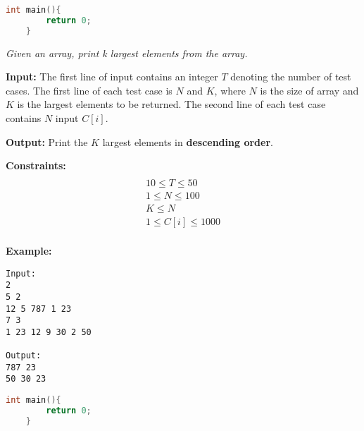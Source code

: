 \begin{solution}
\begin{lstlisting}[language=C++, caption="C++ Solution"]
	int main(){
		return 0;	
	}
\end{lstlisting}

\end{solution}



\begin{problem}
\textit{Given an array, print k largest elements from the array.}

\textbf{Input:}
The first line of input contains an integer $T$ denoting the number of test cases.
The first line of each test case is $N$ and $K$, where $N$ is the size of array and $K$ is the largest elements to be returned.
The second line of each test case contains $N$ input $C[i]$.

\textbf{Output:}
Print the $K$ largest elements in \textbf{descending order}.

\textbf{Constraints:}
\begin{multline}\\
10 \leq T \leq 50\\
1 \leq N \leq 100\\
K \leq N \\
1 \leq C[i] \leq 1000\\
\end{multline}

\textbf{Example:}
\begin{verbatim}
Input:
2
5 2
12 5 787 1 23
7 3
1 23 12 9 30 2 50

Output:
787 23
50 30 23

\end{verbatim}

\end{problem}

\begin{solution}
\begin{lstlisting}[language=C++, caption="C++ Solution"]
	int main(){
		return 0;	
	}
\end{lstlisting}

\end{solution}



